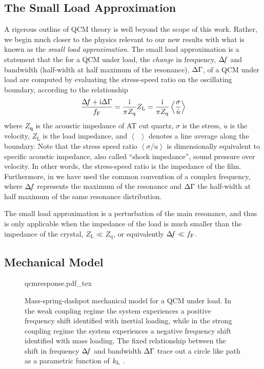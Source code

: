 \subsection{The Small Load Approximation}
A rigerous outline of QCM theory is well beyond the scope of this work.  Rather,
we begin much closer to the physics relevant to our new results with what
is known as the \textit{small load approximation}.  The small load
approximation is a statement that the for a QCM under load, the
\textit{change} in frequency, $\Delta\!f$ and bandwidth (half-width at half
maximum of the resonance), $\Delta\Gamma$, of a QCM under load are computed by evaluating the
stress-speed ratio on the oscillating boundary, according to the
relationship
\begin{equation}
 \frac{\Delta\!f+{\mathrm{i}}\Delta\Gamma}{f_{\mathrm{F}}}=\frac{{\mathrm{i}}}{\pi Z_{\mathrm{q}}}Z_\mathrm{L} =\frac{{\mathrm{i}}}{\pi Z_{\mathrm{q}}}\left<\frac{\sigma}{\dot{u}}\right>
\label{eqn:comsolextract}
\end{equation}
where $Z_\mathbf{q}$ is the acoustic impedance of AT cut quartz, $\sigma$ is the stress, $\dot{u}$ is the
velocity, $Z_\mathrm{L}$ is the load impedance, and $\left<\enspace\right>$
denotes a line average along the boundary.  Note that the stress speed
ratio $\left<\sigma/\dot{u}\right>$ is dimensionally equivalent to specific
acoustic impedance, also called ``shock impedance'', sound pressure over
velocity.  In other words, the stress-speed ratio is the impedance of the
film.  Furthermore, in  we have used the
common convention of a complex frequency, where $\Delta\!f$ represents the
maximum of the resonance and $\Delta\Gamma$ the half-width at half maximum of the
same resonance distribution.

The small load approximation is a perturbation of the main resonance, and
thus is only applicable when the impedance of the load is much smaller than
the impedance of the crystal, $Z_\mathrm{L} \ll Z_\mathrm{q}$, or
equivalently $\Delta\!f \ll f_\mathrm{F}$.

\subsection{Mechanical Model}
\begin{figure}
\centering
{qcmresponse.pdf_tex}
\caption{ Mass-spring-dashpot mechanical model for a QCM under load. In the
weak coupling regime the system experiences a positive frequency shift
identified with inertial loading, while in the strong coupling regime the
system experiences a negative frequency shift identified with mass loading.
The fixed relationship between the shift in frequency $\Delta\!f$ and bandwidth
$\Delta\Gamma$ trace out a circle like path as a parametric function of $k_\mathrm{L}$ .  }
\label{fig:mechanicalmodel}
\end{figure}

